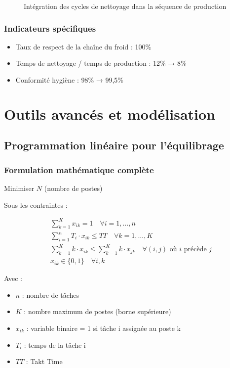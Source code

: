 \documentclass[12pt,a4paper]{article}
\begin{document}
\begin{center}
\begin{figure}[H]
\caption{Intégration des cycles de nettoyage dans la séquence de production}
\label{fig:clean_sequence}
\end{figure}

\subsubsection{Indicateurs spécifiques}
\begin{itemize}
    \item Taux de respect de la chaîne du froid : 100\%
    \item Temps de nettoyage / temps de production : 12\% → 8\%
    \item Conformité hygiène : 98\% → 99,5\%
\end{itemize}

\section{Outils avancés et modélisation}

\subsection{Programmation linéaire pour l'équilibrage}

\subsubsection{Formulation mathématique complète}

Minimiser \(N\) (nombre de postes)

Sous les contraintes :

\[
\begin{aligned}
&\sum_{k=1}^{K} x_{ik} = 1 \quad \forall i = 1,\ldots,n \\
&\sum_{i=1}^{n} T_i \cdot x_{ik} \leq TT \quad \forall k = 1,\ldots,K \\
&\sum_{k=1}^{K} k \cdot x_{ik} \leq \sum_{k=1}^{K} k \cdot x_{jk} \quad \forall (i,j) \text{ où } i \text{ précède } j \\
&x_{ik} \in \{0,1\} \quad \forall i,k
\end{aligned}
\]

Avec :
\begin{itemize}
    \item \(n\) : nombre de tâches
    \item \(K\) : nombre maximum de postes (borne supérieure)
    \item \(x_{ik}\) : variable binaire = 1 si tâche i assignée au poste k
    \item \(T_i\) : temps de la tâche i
    \item \(TT\) : Takt Time
\end{itemize}


\end{center}
\end{document}
